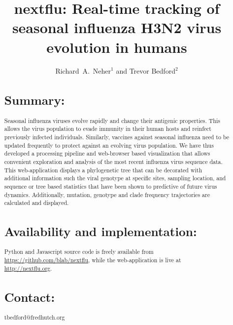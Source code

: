 \documentclass{bioinfo}
\begin{document}
\title[Tracking of seasonal influenza H3N2 virus evolution]{nextflu: Real-time tracking of seasonal influenza H3N2 virus evolution in humans}
\author{Richard~A.~Neher$^{1}$ and Trevor Bedford$^{2}$}
\address{$^{1}$Max Planck Institute for Developmental Biology, 72076 T\"ubingen, Germany, and $^{2}$Vaccine and Infectious Disease Division, Fred Hutchinson Cancer Research Center, Seattle, WA 98109, USA}


\maketitle



\begin{abstract} \section{Summary:} Seasonal influenza viruses evolve rapidly and change their antigenic properties.
This allows the virus population to evade immunity in their human hosts and reinfect previously infected individuals.
Similarly, vaccines against seasonal influenza need to be updated frequently to protect against an evolving virus population.
We have thus developed a processing pipeline and web-browser based visualization that allows convenient exploration and analysis of the most recent influenza virus sequence data.
This web-application displays a phylogenetic tree that can be decorated with additional information such the viral genotype at specific sites, sampling location, and sequence or tree based statistics that have been shown to predictive of future virus dynamics.
Additionally, mutation, genotype and clade frequency trajectories are calculated and displayed.

\section{Availability and implementation:} Python and Javascript source code is freely available from \url{https://github.com/blab/nextflu}, while the web-application is live at \url{http://nextflu.org}.

\section{Contact:} tbedford@fredhutch.org

\end{abstract}
\end{document}

